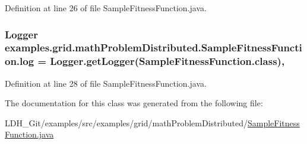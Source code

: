 Definition at line 26 of file Sample\-Fitness\-Function.\-java.

\hypertarget{classexamples_1_1grid_1_1math_problem_distributed_1_1_sample_fitness_function_a144f4d302886d9bbf2a5b025c1684ae3}{
\subsubsection[{log}]{\setlength{\rightskip}{0pt plus 5cm}Logger examples.\-grid.\-math\-Problem\-Distributed.\-Sample\-Fitness\-Function.\-log = Logger.\-get\-Logger(Sample\-Fitness\-Function.\-class)\hspace{0.3cm}{\ttfamily [static]}, {\ttfamily [private]}}}\label{classexamples_1_1grid_1_1math_problem_distributed_1_1_sample_fitness_function_a144f4d302886d9bbf2a5b025c1684ae3}


Definition at line 28 of file Sample\-Fitness\-Function.\-java.



The documentation for this class was generated from the following file\-:\begin{DoxyCompactItemize}
\item 
L\-D\-H\-\_\-\-Git/examples/src/examples/grid/math\-Problem\-Distributed/\hyperlink{grid_2math_problem_distributed_2_sample_fitness_function_8java}{Sample\-Fitness\-Function.\-java}\end{DoxyCompactItemize}
